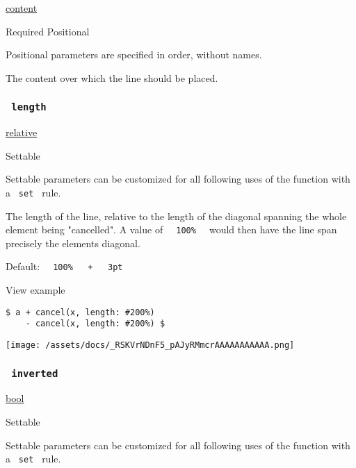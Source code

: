 \href{/docs/reference/foundations/content/}{content}

{Required} {{ Positional }}

\label{parameters-body-positional-tooltip}
Positional parameters are specified in order, without names.

The content over which the line should be placed.

\subsubsection{\texorpdfstring{\texttt{\ length\ }}{ length }}\label{parameters-length}

\href{/docs/reference/layout/relative/}{relative}

{{ Settable }}

\label{parameters-length-settable-tooltip}
Settable parameters can be customized for all following uses of the
function with a \texttt{\ set\ } rule.

The length of the line, relative to the length of the diagonal spanning
the whole element being "cancelled". A value of
\texttt{\ }{\texttt{\ 100\%\ }}\texttt{\ } would then have the line span
precisely the element\textquotesingle s diagonal.

Default:
\texttt{\ }{\texttt{\ 100\%\ }}\texttt{\ }{\texttt{\ +\ }}\texttt{\ }{\texttt{\ 3pt\ }}\texttt{\ }


View example

\begin{verbatim}
$ a + cancel(x, length: #200%)
    - cancel(x, length: #200%) $
\end{verbatim}

\texttt{[image: /assets/docs/\_RSKVrNDnF5\_pAJyRMmcrAAAAAAAAAAA.png]}

\subsubsection{\texorpdfstring{\texttt{\ inverted\ }}{ inverted }}\label{parameters-inverted}

\href{/docs/reference/foundations/bool/}{bool}

{{ Settable }}

\label{parameters-inverted-settable-tooltip}
Settable parameters can be customized for all following uses of the
function with a \texttt{\ set\ } rule.


